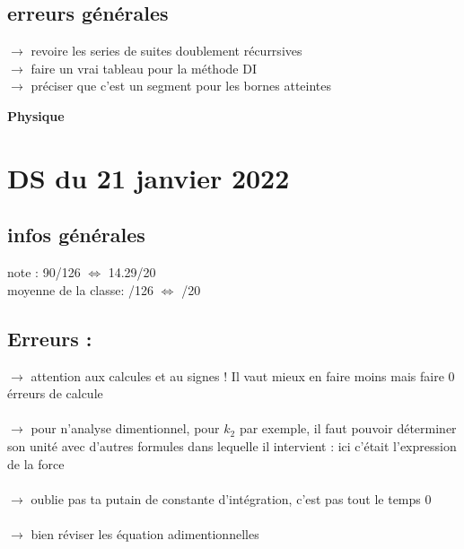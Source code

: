 \documentclass{book}
\begin{document}
\subsection{erreurs générales}

$\rightarrow$ revoire les series de suites doublement récurrsives \\
$\rightarrow$ faire un vrai tableau pour la méthode DI \\
$\rightarrow$ préciser que c'est un segment pour les bornes atteintes




\begin{center}
\textbf{\large Physique}
\end{center}

\vspace{0.6cm}

\section{DS du 21 janvier 2022}

\begin{tcolorbox}[width={14cm},colback={yellow!20!white},title={\textbf{Commentaire générale sur ce DS}},colbacktitle=red!40!white,coltitle=black]    

\end{tcolorbox}

\subsection{infos générales}

note : 90/126 $\Leftrightarrow$ 14.29/20 \\
moyenne de la classe: /126 $\Leftrightarrow$ /20

\subsection{Erreurs :}

$\rightarrow$ attention aux calcules et au signes ! Il vaut mieux en faire moins mais faire 0 érreurs de calcule \\ \\
$\rightarrow$ pour n'analyse dimentionnel, pour $k_2$ par exemple, il faut pouvoir déterminer son unité avec d'autres formules dans lequelle il intervient : ici c'était l'expression de la force \\ \\
$\rightarrow$ oublie pas ta putain de constante d'intégration, c'est pas tout le temps 0 \\ \\
$\rightarrow$ bien réviser les équation adimentionnelles \\ \\
\end{document}
